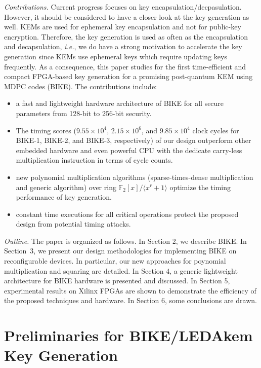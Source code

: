 \documentclass[preprint]{iacrtrans}
\begin{document}
\textit{Contributions.} Current progress focuses on key encapsulation/decpasulation. However, it should be considered to have a closer look at the
key generation as well. KEMs are used for ephemeral
key encapsulation and not for public-key encryption. Therefore, the key
generation is used as often as the encapsulation and decapsulation, \textit{i.e.},
we do have a strong motivation to accelerate the key generation since KEMs use ephemeral keys which require updating keys frequently.
As a consequence, this paper studies for the first time-efficient and compact FPGA-based key generation for a promising post-quantum KEM using MDPC codes (BIKE). The contributions include:
\begin{itemize}
  \item a fast and lightweight hardware architecture of BIKE for all secure parameters from 128-bit to 256-bit security.
  \item The timing scores ($9.55 \times 10^4$, $2.15 \times 10^6$, and $9.85 \times 10^4$ clock cycles for BIKE-1, BIKE-2, and BIKE-3, respectively) of our design outperform other embedded hardware and even powerful CPU with the dedicate carry-less multiplication instruction in terms of cycle counts.
  \item new polynomial multiplication algorithms (sparse-times-dense multiplication and generic algorithm) over ring $\mathbb{F}_2[x]/\langle x^r+1\rangle$ optimize the timing performance of key generation.
  \item constant time executions for all critical operations protect the proposed design from potential timing attacks.
\end{itemize}

\textit{Outline.} The paper is organized as follows. In Section 2, we describe BIKE. In Section~3, we present our design methodologies for implementing BIKE on reconfigurable devices. In particular, our new approaches for poynomial multiplication and squaring are detailed. In Section 4, a generic lightweight architecture for BIKE hardware is presented and discussed. In Section 5, experimental results on Xilinx FPGAs are shown to demonstrate the efficiency of the proposed techniques and hardware. In Section 6, some conclusions are drawn.

\section{Preliminaries for BIKE/LEDAkem Key Generation}
\end{document}
